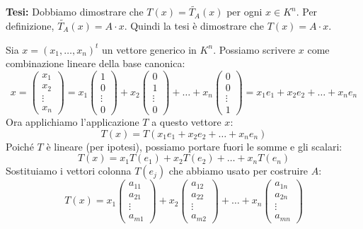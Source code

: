 {{    \textbf{Tesi:} Dobbiamo dimostrare che \(T(x) = \tilde{T_A}(x)\) per ogni \(x \in K^n\).
    Per definizione, \(\tilde{T_A}(x) = A \cdot x\). Quindi la tesi è dimostrare che \(T(x) = A \cdot x\).
    
    Sia \(x = (x_1, \dots, x_n)^t\) un vettore generico in \(K^n\).
    Possiamo scrivere \(x\) come combinazione lineare della base canonica:
    \[
    x = \begin{pmatrix} x_1 \\ x_2 \\ \vdots \\ x_n \end{pmatrix} = x_1 \begin{pmatrix} 1 \\ 0 \\ \vdots \\ 0 \end{pmatrix} + x_2 \begin{pmatrix} 0 \\ 1 \\ \vdots \\ 0 \end{pmatrix} + \dots + x_n \begin{pmatrix} 0 \\ 0 \\ \vdots \\ 1 \end{pmatrix} = x_1 e_1 + x_2 e_2 + \dots + x_n e_n
    \]
    Ora applichiamo l'applicazione \(T\) a questo vettore \(x\):
    \[
    T(x) = T(x_1 e_1 + x_2 e_2 + \dots + x_n e_n)
    \]
    Poiché \(T\) è lineare (per ipotesi), possiamo portare fuori le somme e gli scalari:
    \[
    T(x) = x_1 T(e_1) + x_2 T(e_2) + \dots + x_n T(e_n)
    \]
    Sostituiamo i vettori colonna \(T(e_j)\) che abbiamo usato per costruire \(A\):
    \[
    T(x) = x_1 \begin{pmatrix} a_{11} \\ a_{21} \\ \vdots \\ a_{m1} \end{pmatrix} +
    x_2 \begin{pmatrix} a_{12} \\ a_{22} \\ \vdots \\ a_{m2} \end{pmatrix} + \dots +
    x_n \begin{pmatrix} a_{1n} \\ a_{2n} \\ \vdots \\ a_{mn} \end{pmatrix}
\]}}

